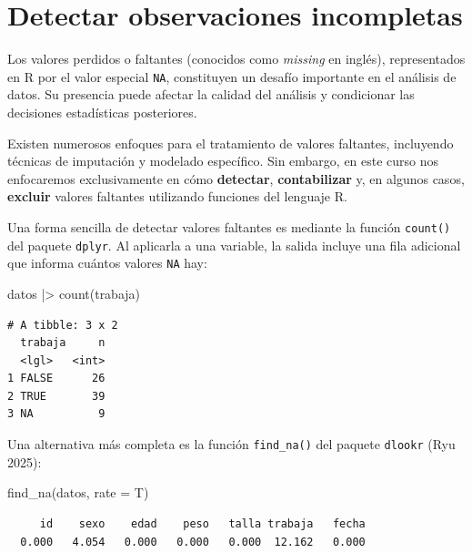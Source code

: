 \documentclass[
  spanish,
  a4paper,
]{scrbook}
\newenvironment{Shaded}{\begin{snugshade}}{\end{snugshade}}
\newcommand{\AttributeTok}[1]{\textcolor[rgb]{0.40,0.45,0.13}{#1}}
\newcommand{\FunctionTok}[1]{\textcolor[rgb]{0.28,0.35,0.67}{#1}}
\newcommand{\NormalTok}[1]{\textcolor[rgb]{0.00,0.23,0.31}{#1}}
\newcommand{\SpecialCharTok}[1]{\textcolor[rgb]{0.37,0.37,0.37}{#1}}
\begin{document}
\section{Detectar observaciones
incompletas}\label{detectar-observaciones-incompletas}

Los valores perdidos o faltantes (conocidos como \emph{missing} en
inglés), representados en R por el valor especial \texttt{NA},
constituyen un desafío importante en el análisis de datos. Su presencia
puede afectar la calidad del análisis y condicionar las decisiones
estadísticas posteriores.

Existen numerosos enfoques para el tratamiento de valores faltantes,
incluyendo técnicas de imputación y modelado específico. Sin embargo, en
este curso nos enfocaremos exclusivamente en cómo \textbf{detectar},
\textbf{contabilizar} y, en algunos casos, \textbf{excluir} valores
faltantes utilizando funciones del lenguaje R.

Una forma sencilla de detectar valores faltantes es mediante la función
\texttt{count()} del paquete \texttt{dplyr}. Al aplicarla a una
variable, la salida incluye una fila adicional que informa cuántos
valores \texttt{NA} hay:

\begin{Shaded}
\begin{Highlighting}[]
\NormalTok{datos }\SpecialCharTok{|\textgreater{}}
  \FunctionTok{count}\NormalTok{(trabaja)}
\end{Highlighting}
\end{Shaded}

\begin{verbatim}
# A tibble: 3 x 2
  trabaja     n
  <lgl>   <int>
1 FALSE      26
2 TRUE       39
3 NA          9
\end{verbatim}

Una alternativa más completa es la función \texttt{find\_na()} del
paquete \texttt{dlookr} (Ryu 2025):

\begin{Shaded}
\begin{Highlighting}[]
\FunctionTok{find\_na}\NormalTok{(datos, }\AttributeTok{rate =}\NormalTok{ T)}
\end{Highlighting}
\end{Shaded}

\begin{verbatim}
     id    sexo    edad    peso   talla trabaja   fecha 
  0.000   4.054   0.000   0.000   0.000  12.162   0.000 
\end{verbatim}
\end{document}
